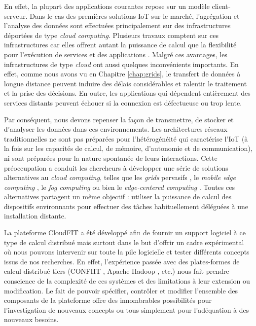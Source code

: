 En effet, la plupart des applications courantes repose sur un modèle client-serveur. Dans le cas des premières solutions IoT sur le marché, l'agrégation et l'analyse des données sont effectuées principalement sur des infrastructures déportées de type \textit{cloud computing}. Plusieurs travaux \cite{Miorandi2012, Gubbi2013, Fazio2015} comptent sur ces infrastructures car elles offrent autant la puissance de calcul que la flexibilité pour l'exécution de services et des applications \cite{Serrano2013}. Malgré ces avantages, les infrastructures de type \textit{cloud} ont aussi quelques inconvénients importants. En effet, comme nous avons vu en Chapitre \ref{chap:grids}, le transfert de données à longue distance peuvent induire des délais considérables et ralentir le traitement et la prise des décisions. En outre, les applications qui dépendent entièrement des services distants peuvent échouer si la connexion est défectueuse ou trop lente.

Par conséquent, nous devons repenser la façon de transmettre, de stocker et d'analyser les données dans ces environnements. Les architectures réseaux traditionnelles ne sont pas préparées pour l'hétérogénéité qui caractérise l'IoT (à la fois sur les capacités de calcul, de mémoire, d'autonomie et de communication), ni sont préparées pour la nature spontanée de leurs interactions. Cette préoccupation a conduit les chercheurs à développer une série de solutions alternatives au \textit{cloud computing}, telles que les \textit{grids} pervasifs \cite{Parashar2010}, le \textit{mobile edge computing} \cite {Dey2013,MEC,Satyanarayanan09}, le \textit{fog computing} \cite{Bonomi2012} ou bien le \textit{edge-centered computing} \cite{Lopez2015}. Toutes ces alternatives partagent un même objectif : utiliser la puissance de calcul des dispositifs environnants pour effectuer des tâches habituellement déléguées à une installation distante. 

La plateforme CloudFIT a été développé afin de fournir un support logiciel à ce type de calcul distribué mais surtout dans le but d'offrir un cadre expérimental où nous pouvons intervenir sur toute la pile logicielle et tester différents concepts issus de nos recherches. En effet, l'expérience passée avec des plates-formes de calcul distribué tiers (CONFIIT \cite{Flauzac10}, Apache Hadoop \cite{Hadoop,Steffenel13b}, etc.) nous fait prendre conscience de la complexité de ces systèmes et des limitations à leur  extension ou modification. Le fait de pouvoir spécifier, contrôler et modifier l'ensemble des composants de la plateforme offre des innombrables possibilités pour l'investigation de nouveaux concepts ou tous simplement pour l'adéquation à des nouveaux besoins. 
  
